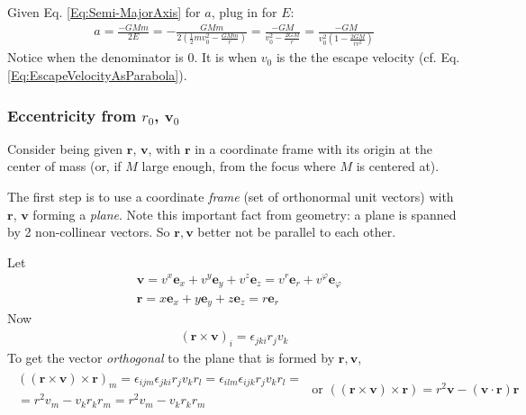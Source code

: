 \documentclass[10pt]{amsart}
\begin{document}
\begin{multicols*}{2}
Given Eq. \ref{Eq:Semi-MajorAxis} for $a$, plug in for $E$:
\begin{equation}
\begin{gathered}
a = \frac{ - GMm}{2 E} = - \frac{GMm}{ 2 \left( \frac{1}{2} m v_0^2 - \frac{GMm}{r} \right) } = \frac{ -GM }{ v_0^2 - \frac{2GM}{r} } = \frac{ - GM }{ v_0^2 \left( 1 - \frac{2 GM}{ rv^2 }\right)} 
\end{gathered}
\end{equation}
Notice when the denominator is 0. It is when $v_0$ is the the escape velocity (cf. Eq. \ref{Eq:EscapeVelocityAsParabola}). 

\subsubsection{Eccentricity from $r_0$, $\mathbf{v}_0$}

Consider being given $\mathbf{r}$, $\mathbf{v}$, with $\mathbf{r}$ in a coordinate frame with its origin at the center of mass (or, if $M$ large enough, from the focus where $M$ is centered at). 

The first step is to use a coordinate \emph{frame} (set of orthonormal unit vectors) with $\mathbf{r}$, $\mathbf{v}$ forming a \emph{plane}. Note this important fact from geometry: a plane is spanned by 2 non-collinear vectors. So $\mathbf{r}, \mathbf{v}$ better not be parallel to each other.

Let 
\[
\begin{aligned} 
	& \mathbf{v} = v^x \mathbf{e}_x + v^y \mathbf{e}_y + v^z \mathbf{e}_z = v^r \mathbf{e}_r + v^{\varphi} \mathbf{e}_{\varphi} \\ 
	& \mathbf{r} = x \mathbf{e}_x + y \mathbf{e}_y + z \mathbf{e}_z = r\mathbf{e}_r
\end{aligned} 
\]
Now 
\[
\begin{gathered}
(\mathbf{r} \times \mathbf{v})_i = \epsilon_{jki} r_j v_k 
\end{gathered}
\]
To get the vector \emph{orthogonal} to the plane that is formed by $\mathbf{r}, \mathbf{v}$, 
\[
\begin{gathered}
\begin{gathered}
	((\mathbf{r} \times \mathbf{v}) \times \mathbf{r})_m = \epsilon_{ijm} \epsilon_{jki} r_j v_k r_l = \epsilon_{ilm} \epsilon_{ijk} r_j v_k r_l = \\
	= r^2 v_m - v_k r_k r_m = r^2 v_m - v_k r_k r_m
\end{gathered}
\text{ or } ((\mathbf{r} \times \mathbf{v}) \times \mathbf{r}) = r^2 \mathbf{v} - (\mathbf{v} \cdot \mathbf{r}) \mathbf{r}
\end{gathered}
\]


\end{multicols*}
\end{document}
